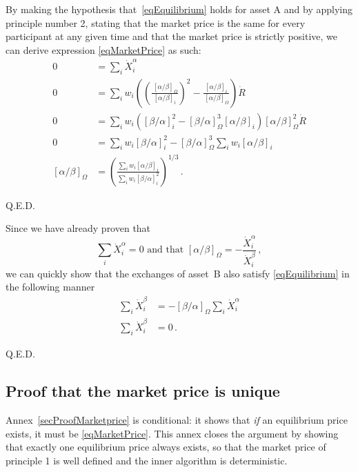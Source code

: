 \documentclass[letterpaper]{article}
\newcommand{\priceAB}{\left[\alpha / \beta\right]}
\newcommand{\priceBA}{\left[\beta / \alpha\right]}
\begin{document}
By making the hypothesis that~\eqref{eqEquilibrium} holds for asset A and by applying principle number 2, stating that the market price is the same for every participant at any given time and that the market price is strictly positive, we can derive expression \eqref{eqMarketPrice} as such:
\begin{align*}
    0 &= \sum_i \dot{X}_i^\alpha\\
    0 &= \sum_i w_i \left( \left( \frac{\hspace{2pt}\priceAB_\Omega}{\priceAB_i}\right)^2 - \frac{\priceAB_i}{\hspace{2pt}\priceAB_\Omega} \right) \dot{R} \\
    0 &= \sum_i w_i \left( \priceBA_i^2 - \priceBA_\Omega^3 \priceAB_i \right) \priceAB_\Omega^2 \dot{R}\\
    0 &= \sum_i w_i \priceBA_i^2 - \priceBA_\Omega^3 \sum_i w_i \priceAB_i\\
    \priceAB_\Omega &= \left( \frac{\displaystyle \sum_i w_i \priceAB_i}{\displaystyle \sum_i w_i \priceBA_i^2}\right)^{1/3} \,.
\end{align*}
\begin{flushright}
Q.E.D.
\end{flushright}
Since we have already proven that
\begin{equation*}
    \sum_i \dot{X}_i^\alpha = 0 \text{ and that }\priceAB_\Omega = -\frac{\dot{X}_i^\alpha}{\dot{X}_i^\beta}\,,
\end{equation*}
we can quickly show that the exchanges of asset~B also satisfy \eqref{eqEquilibrium} in the following manner
\begin{align*}
    \sum_i \dot{X}_i^\beta &= -\priceBA_\Omega \sum_i \dot{X}_i^\alpha\\
    \sum_i \dot{X}_i^\beta &= 0 \,.
\end{align*}
\begin{flushright}
Q.E.D.
\end{flushright}

\subsection{Proof that the market price is unique}\label{secProofUniqueness}

Annex~\ref{secProofMarketprice} is conditional: it shows that \emph{if} an equilibrium price exists, it must be \eqref{eqMarketPrice}. This annex closes the argument by showing that exactly one equilibrium price always exists, so that the market price of principle 1 is well defined and the inner algorithm is deterministic.
\end{document}
